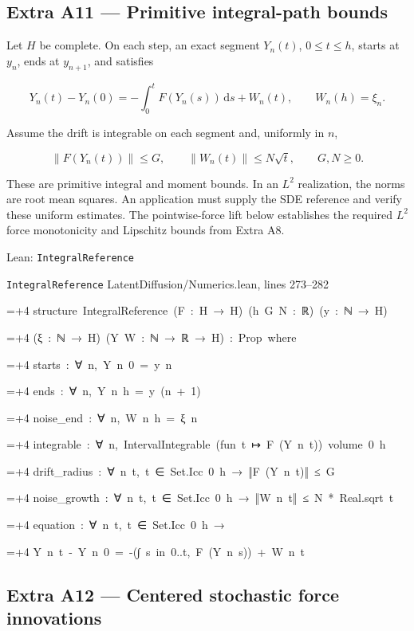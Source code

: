 \documentclass[11pt,a4paper]{report}
\newlength{\leancharwidth}
\newenvironment{leancode}{\par\smallskip\begingroup\ttfamily\footnotesize\raggedright
  \settowidth{\leancharwidth}{M}\setlength{\parskip}{0pt}\setlength{\parindent}{0pt}
  \frenchspacing}{\par\endgroup\smallskip}
\newcommand{\leanline}[2]{\hangindent=\dimexpr#1\leancharwidth+4\leancharwidth\relax
  \hangafter=1\noindent\hspace*{#1\leancharwidth}#2\par}
\newcommand{\leansource}[1]{\par{\footnotesize\color{leanmuted}#1}\par}
\begin{document}
\subsection{\texorpdfstring{Extra A11 — Primitive integral-path bounds}{Extra A11 — Primitive integral-path bounds}}



Let \(H\) be complete. On each step, an exact segment \(Y_n(t)\), \(0\le t\le h\), starts at \(y_n\), ends at \(y_{n+1}\), and satisfies



\[Y_n(t)-Y_n(0)=-\int_0^t F(Y_n(s))\,\mathrm ds+W_n(t),\qquad W_n(h)=\xi_n.\]



Assume the drift is integrable on each segment and, uniformly in \(n\),



\[\|F(Y_n(t))\|\le G,\qquad\|W_n(t)\|\le N\sqrt t,\qquad G,N\ge0.\]



These are primitive integral and moment bounds. In an \(L^2\) realization, the norms are root mean squares. An application must supply the SDE reference and verify these uniform estimates. The pointwise-force lift below establishes the required \(L^2\) force monotonicity and Lipschitz bounds from Extra A8.

\begin{leanbox}{Lean: \texttt{IntegralReference}}
\leansource{\texttt{IntegralReference} \quad LatentDiffusion/\allowbreak{}Numerics.lean, lines 273–282}
\begin{leancode}
\leanline{0}{structure\ IntegralReference\ (F\ :\ H\ →\ H)\ (h\ G\ N\ :\ ℝ)\ (y\ :\ ℕ\ →\ H)}
\leanline{4}{(ξ\ :\ ℕ\ →\ H)\ (Y\ W\ :\ ℕ\ →\ ℝ\ →\ H)\ :\ Prop\ where}
\leanline{2}{starts\ :\ ∀\ n,\ Y\ n\ 0\ =\ y\ n}
\leanline{2}{ends\ :\ ∀\ n,\ Y\ n\ h\ =\ y\ (n\ +\ 1)}
\leanline{2}{noise\_end\ :\ ∀\ n,\ W\ n\ h\ =\ ξ\ n}
\leanline{2}{integrable\ :\ ∀\ n,\ IntervalIntegrable\ (fun\ t\ ↦\ F\ (Y\ n\ t))\ volume\ 0\ h}
\leanline{2}{drift\_radius\ :\ ∀\ n\ t,\ t\ ∈\ Set.Icc\ 0\ h\ →\ ‖F\ (Y\ n\ t)‖\ ≤\ G}
\leanline{2}{noise\_growth\ :\ ∀\ n\ t,\ t\ ∈\ Set.Icc\ 0\ h\ →\ ‖W\ n\ t‖\ ≤\ N\ *\ Real.sqrt\ t}
\leanline{2}{equation\ :\ ∀\ n\ t,\ t\ ∈\ Set.Icc\ 0\ h\ →}
\leanline{4}{Y\ n\ t\ -\ Y\ n\ 0\ =\ -(∫\ s\ in\ 0..t,\ F\ (Y\ n\ s))\ +\ W\ n\ t}
\end{leancode}
\end{leanbox}
\subsection{\texorpdfstring{Extra A12 — Centered stochastic force innovations}{Extra A12 — Centered stochastic force innovations}}
\end{document}
